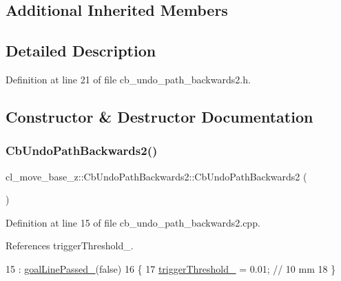 \subsection*{Additional Inherited Members}


\subsection{Detailed Description}


Definition at line 21 of file cb\+\_\+undo\+\_\+path\+\_\+backwards2.\+h.



\subsection{Constructor \& Destructor Documentation}
\mbox{\label{classcl__move__base__z_1_1CbUndoPathBackwards2_a0f202bf7a4b1cc1db426a0c2ad1434f6}} 
\subsubsection{\texorpdfstring{Cb\+Undo\+Path\+Backwards2()}{CbUndoPathBackwards2()}}
{\footnotesize\ttfamily cl\+\_\+move\+\_\+base\+\_\+z\+::\+Cb\+Undo\+Path\+Backwards2\+::\+Cb\+Undo\+Path\+Backwards2 (\begin{DoxyParamCaption}{ }\end{DoxyParamCaption})}



Definition at line 15 of file cb\+\_\+undo\+\_\+path\+\_\+backwards2.\+cpp.



References trigger\+Threshold\+\_\+.


\begin{DoxyCode}
15                                            : \hyperlink{classcl__move__base__z_1_1CbUndoPathBackwards2_a1c037317330c74b60660548f09a01749}{goalLinePassed\_}(\textcolor{keyword}{false})
16 \{
17   \hyperlink{classcl__move__base__z_1_1CbUndoPathBackwards2_a452bcdab678ea02d6d6a0ae06fb484ab}{triggerThreshold\_} = 0.01;  \textcolor{comment}{// 10 mm}
18 \}
\end{DoxyCode}


